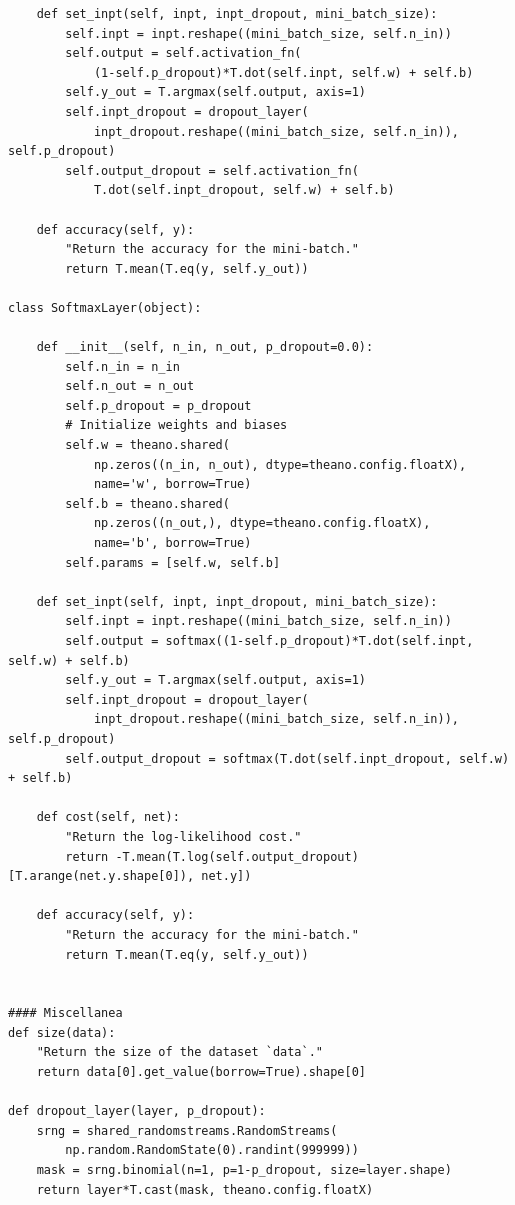 \documentclass[a4paper,twoside,10pt]{book}
\begin{document}
\begin{lstlisting}
    def set_inpt(self, inpt, inpt_dropout, mini_batch_size):
        self.inpt = inpt.reshape((mini_batch_size, self.n_in))
        self.output = self.activation_fn(
            (1-self.p_dropout)*T.dot(self.inpt, self.w) + self.b)
        self.y_out = T.argmax(self.output, axis=1)
        self.inpt_dropout = dropout_layer(
            inpt_dropout.reshape((mini_batch_size, self.n_in)), self.p_dropout)
        self.output_dropout = self.activation_fn(
            T.dot(self.inpt_dropout, self.w) + self.b)

    def accuracy(self, y):
        "Return the accuracy for the mini-batch."
        return T.mean(T.eq(y, self.y_out))

class SoftmaxLayer(object):

    def __init__(self, n_in, n_out, p_dropout=0.0):
        self.n_in = n_in
        self.n_out = n_out
        self.p_dropout = p_dropout
        # Initialize weights and biases
        self.w = theano.shared(
            np.zeros((n_in, n_out), dtype=theano.config.floatX),
            name='w', borrow=True)
        self.b = theano.shared(
            np.zeros((n_out,), dtype=theano.config.floatX),
            name='b', borrow=True)
        self.params = [self.w, self.b]

    def set_inpt(self, inpt, inpt_dropout, mini_batch_size):
        self.inpt = inpt.reshape((mini_batch_size, self.n_in))
        self.output = softmax((1-self.p_dropout)*T.dot(self.inpt, self.w) + self.b)
        self.y_out = T.argmax(self.output, axis=1)
        self.inpt_dropout = dropout_layer(
            inpt_dropout.reshape((mini_batch_size, self.n_in)), self.p_dropout)
        self.output_dropout = softmax(T.dot(self.inpt_dropout, self.w) + self.b)

    def cost(self, net):
        "Return the log-likelihood cost."
        return -T.mean(T.log(self.output_dropout)[T.arange(net.y.shape[0]), net.y])

    def accuracy(self, y):
        "Return the accuracy for the mini-batch."
        return T.mean(T.eq(y, self.y_out))


#### Miscellanea
def size(data):
    "Return the size of the dataset `data`."
    return data[0].get_value(borrow=True).shape[0]

def dropout_layer(layer, p_dropout):
    srng = shared_randomstreams.RandomStreams(
        np.random.RandomState(0).randint(999999))
    mask = srng.binomial(n=1, p=1-p_dropout, size=layer.shape)
    return layer*T.cast(mask, theano.config.floatX)
\end{lstlisting}
\end{document}
